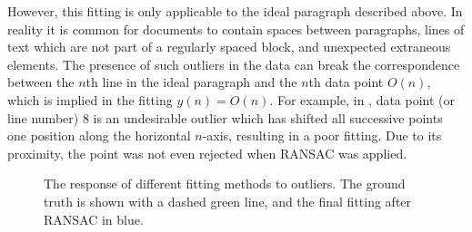 {However, this fitting is only applicable to the ideal paragraph described above.
In reality it is common for documents to contain
spaces between paragraphs,
lines of text which are not part of a regularly spaced block,
and unexpected extraneous elements.
The presence of such outliers in the data can break the correspondence between
the $n$th line in the ideal paragraph and the $n$th data point $O(n)$, which is implied in the fitting $y(n)=O(n)$.
For example, in , data point (or line number) 8 is an undesirable outlier
which has shifted all successive points one position along the horizontal $n$-axis,
resulting in a poor fitting.
Due to its proximity, the point was not even rejected when RANSAC was applied.
\begin{figure}[t]
\centering
\begin{center}
	\caption{The response of different fitting methods to outliers.
		The ground truth is shown with a dashed green line, and the final fitting after RANSAC in blue.
	}
	\label{fittingexamples}
\end{center}
\end{figure}
}
